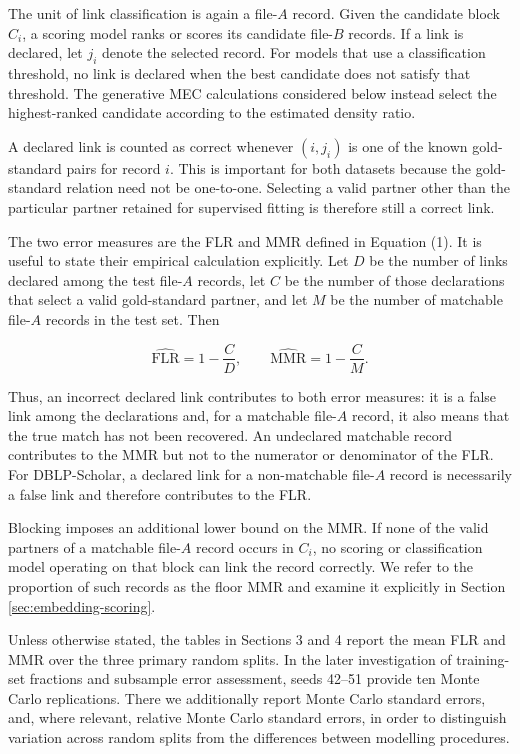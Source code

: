 The unit of link classification is again a file-$A$ record. Given the
candidate block $C_i$, a scoring model ranks or scores its candidate
file-$B$ records. If a link is declared, let $j_i$ denote the selected
record. For models that use a classification threshold, no link is
declared when the best candidate does not satisfy that threshold. The
generative MEC calculations considered below instead select the
highest-ranked candidate according to the estimated density ratio.

A declared link is counted as correct whenever $(i,j_i)$ is one of the
known gold-standard pairs for record $i$. This is important for both
datasets because the gold-standard relation need not be one-to-one.
Selecting a valid partner other than the particular partner retained for
supervised fitting is therefore still a correct link.

The two error measures are the FLR and MMR defined in Equation (1).
It is useful to state their empirical calculation explicitly. Let $D$
be the number of links declared among the test file-$A$ records, let
$C$ be the number of those declarations that select a valid
gold-standard partner, and let $M$ be the number of matchable file-$A$
records in the test set. Then

\[
\widehat{\mathrm{FLR}}
=
1-\frac{C}{D},
\qquad
\widehat{\mathrm{MMR}}
=
1-\frac{C}{M}.
\]

Thus, an incorrect declared link contributes to both error measures:
it is a false link among the declarations and, for a matchable
file-$A$ record, it also means that the true match has not been
recovered. An undeclared matchable record contributes to the MMR but
not to the numerator or denominator of the FLR. For DBLP-Scholar,
a declared link for a non-matchable file-$A$ record is necessarily a
false link and therefore contributes to the FLR.

Blocking imposes an additional lower bound on the MMR. If none of the
valid partners of a matchable file-$A$ record occurs in $C_i$, no
scoring or classification model operating on that block can link the
record correctly. We refer to the proportion of such records as the
floor MMR and examine it explicitly in Section
\ref{sec:embedding-scoring}.

Unless otherwise stated, the tables in Sections 3 and 4 report the mean
FLR and MMR over the three primary random splits. In the later
investigation of training-set fractions and subsample error assessment,
seeds 42--51 provide ten Monte Carlo replications. There we additionally
report Monte Carlo standard errors, and, where relevant, relative Monte
Carlo standard errors, in order to distinguish variation across random
splits from the differences between modelling procedures.

